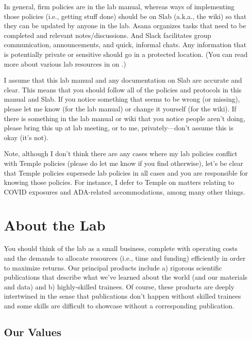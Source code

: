 \documentclass[letterpaper,11pt,oneside]{memoir}
\begin{document}
In general, firm policies are in the lab manual, whereas ways of implementing those policies (i.e., getting stuff done) should be on Slab (a.k.a., the wiki) so that they can be updated by anyone in the lab. Asana organizes tasks that need to be completed and relevant notes/discussions. And Slack facilitates group communication, announcements, and quick, informal chats. Any information that is potentially private or sensitive should go in a protected location. (You can read more about various lab resources in  on .)

\begin{shaded}
\noindent I assume that this lab manual and any documentation on Slab are accurate and clear. This means that you should follow all of the policies and protocols in this manual and Slab. If you notice something that seems to be wrong (or missing), please let me know (for the lab manual) or change it yourself (for the wiki). If there is something in the lab manual or wiki that you notice people aren't doing, please bring this up at lab meeting, or to me, privately---don't assume this is okay (it's not). 
\end{shaded}

Note, although I don't think there are any cases where my lab policies conflict with Temple policies (please do let me know if you find otherwise), let's be clear that Temple policies supersede lab policies in all cases and you are responsible for knowing those policies. For instance, I defer to Temple on matters relating to COVID exposures and ADA-related accommodations, among many other things.


\chapter{About the Lab} 
You should think of the lab as a small business, complete with operating costs and the demands to allocate resources (i.e., time and funding) efficiently in order to maximize returns. Our principal products include a) rigorous scientific publications that describe what we've learned about the world (and our materials and data) and b) highly-skilled trainees. Of course, these products are deeply intertwined in the sense that publications don't happen without skilled trainees and some skills are difficult to showcase without a corresponding publication.

\section{Our Values}
\end{document}
